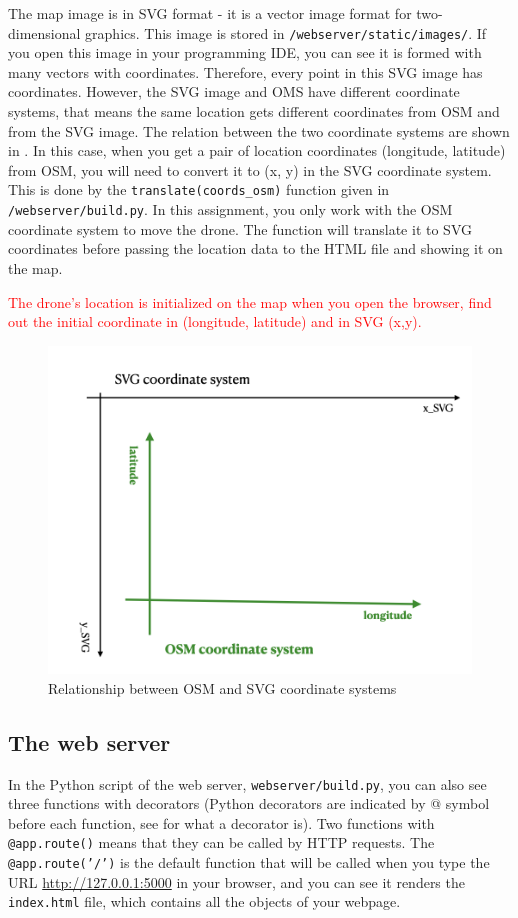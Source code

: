 \documentclass{article}
\begin{document}
The map image is in SVG format - it is a vector image format for two-dimensional graphics. This image is stored in \texttt{/webserver/static/images/}. If you open this image in your programming IDE, you can see it is formed with many vectors with coordinates. Therefore, every point in this SVG image has coordinates. However, the SVG image and OMS have different coordinate systems, that means the same location gets different coordinates from OSM and from the SVG image. The relation between the two coordinate systems are shown in .  In this case, when you get a pair of location coordinates (longitude, latitude) from OSM, you will need to convert it to (x, y) in the SVG coordinate system. This is done by the \texttt{translate(coords\_osm)} function given in \texttt{/webserver/build.py}. In this assignment, you only work with the OSM coordinate system to move the drone. The function will translate it to SVG coordinates before passing the location data to the HTML file and showing it on the map.\\

\parbox[t]{14cm}{\textcolor{red}{The drone's location is initialized on the map when you open the browser, find out the initial coordinate in (longitude, latitude) and in SVG (x,y).}}


\begin{figure}[h!]
    \centering
    \includegraphics[width=120mm]{coords_sys.png}
    \caption{Relationship between OSM and SVG coordinate systems}
    \label{fig:OSMtoSVG}
\end{figure}

\subsection{The web server}
In the Python script of the web server, \texttt{webserver/build.py}, you can also see three functions with decorators (Python decorators are indicated by @ symbol before each function, see \cite{deco} for what a decorator is). Two functions with \texttt{@app.route()} means that they can be called by HTTP requests. The \texttt{@app.route('/')} is the default function that will be called when you type the URL \url{http://127.0.0.1:5000} in your browser, and you can see it renders the \texttt{index.html} file, which contains all the objects of your webpage. 
\end{document}
